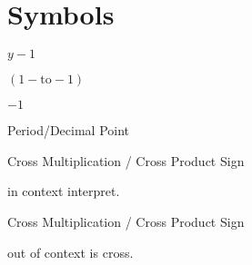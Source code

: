 
\section{Symbols}
\label{sec:symbols}

\R
\E $y-1$

\E $(1-\mathrm{to}-1)$

\E $-1$

\R

Period/Decimal Point

\R

Cross Multiplication / Cross Product Sign

in context interpret.

\R


Cross Multiplication / Cross Product Sign

out of context is cross.


